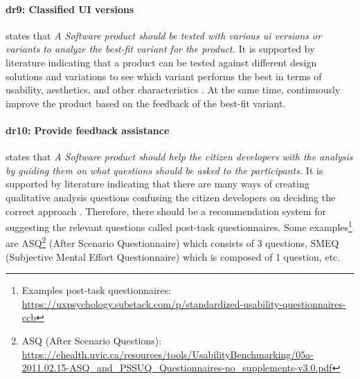 \paragraph*{\ac{dr}9: Classified UI versions} states that \textit{A Software product should be tested with various \ac{ui} versions or variants to analyze the best-fit variant for the product.}
It is supported by literature indicating that a product can be tested against different design solutions and variations \cite{article:CE:fitzgerald} to see which variant performs the best in terms of usability, aesthetics, and other characteristics \cite{article:controlled:experiements}. 
At the same time, continuously improve \cite{article:CE:ros} the product based on the feedback of the best-fit variant.

\paragraph*{\ac{dr}10: Provide feedback assistance} states that \textit{A Software product should help the citizen developers with the analysis by guiding them on what questions should be asked to the participants.}
It is supported by literature indicating that there are many ways of creating qualitative analysis questions \cite{misc:dsr:mayring} confusing the citizen developers on deciding the correct approach \cite{misc:qualitative:qualitative}.
Therefore, there should be a recommendation system for suggesting the relevant questions called post-task questionnaires.
Some examples\footnote{Examples post-task questionnaires: \url{https://uxpsychology.substack.com/p/standardized-usability-questionnaires-ccb}} are ASQ\footnote{ASQ (After Scenario Questions): \url{https://ehealth.uvic.ca/resources/tools/UsabilityBenchmarking/05a-2011.02.15-ASQ_and_PSSUQ_Questionnaires-no_supplements-v3.0.pdf}} (After Scenario Questionnaire) which consists of 3 questions, SMEQ (Subjective Mental Effort Questionnaire) which is composed of 1 question, etc. 

\clearpage
